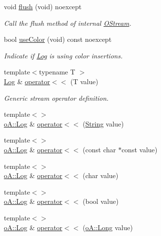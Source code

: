 \begin{DoxyCompactItemize}
void \mbox{\hyperlink{classo_a_1_1_log_ae0c062e6cd347b0e74f74c958a05b20d}{flush}} (void) noexcept
\begin{DoxyCompactList}\small\item\em Call the flush method of internal \mbox{\hyperlink{namespaceo_a_ab69b2110953f22401259db9c6ddc7905}{O\+Stream}}. \end{DoxyCompactList}\item 
bool \mbox{\hyperlink{classo_a_1_1_log_a212bf1558c244679cf0e361fc1cf1e9a}{use\+Color}} (void) const noexcept
\begin{DoxyCompactList}\small\item\em Indicate if \mbox{\hyperlink{classo_a_1_1_log_a8f57798a38bc53782107ee07f2f2caa5}{Log}} is using color insertions. \end{DoxyCompactList}\item 
{\footnotesize template$<$typename T $>$ }\\\mbox{\hyperlink{classo_a_1_1_log}{Log}} \& \mbox{\hyperlink{classo_a_1_1_log_a6ce6d2f750bf3baeda1c2541617e4952}{operator$<$$<$}} (T value)
\begin{DoxyCompactList}\small\item\em Generic stream operator definition. \end{DoxyCompactList}\item 
{\footnotesize template$<$$>$ }\\\mbox{\hyperlink{classo_a_1_1_log}{o\+A\+::\+Log}} \& \mbox{\hyperlink{classo_a_1_1_log_acfa81696d9db53900bb4d03f278024ee}{operator$<$$<$}} (\mbox{\hyperlink{classo_a_1_1_string}{String}} value)
\item 
{\footnotesize template$<$$>$ }\\\mbox{\hyperlink{classo_a_1_1_log}{o\+A\+::\+Log}} \& \mbox{\hyperlink{classo_a_1_1_log_ae274c2ff1bc29ba718265e46fcc6207c}{operator$<$$<$}} (const char $\ast$const value)
\item 
{\footnotesize template$<$$>$ }\\\mbox{\hyperlink{classo_a_1_1_log}{o\+A\+::\+Log}} \& \mbox{\hyperlink{classo_a_1_1_log_a54dba53cce06861c82dc760d9c809633}{operator$<$$<$}} (char value)
\item 
{\footnotesize template$<$$>$ }\\\mbox{\hyperlink{classo_a_1_1_log}{o\+A\+::\+Log}} \& \mbox{\hyperlink{classo_a_1_1_log_a151d996709b215055998475e5610ea2c}{operator$<$$<$}} (bool value)
\item 
{\footnotesize template$<$$>$ }\\\mbox{\hyperlink{classo_a_1_1_log}{o\+A\+::\+Log}} \& \mbox{\hyperlink{classo_a_1_1_log_a206fea477101843b2eb9cbc71ebd34cd}{operator$<$$<$}} (\mbox{\hyperlink{namespaceo_a_ab34d92c907da3ac86211277a1341c6c2}{o\+A\+::\+Long}} value)

\end{DoxyCompactItemize}
